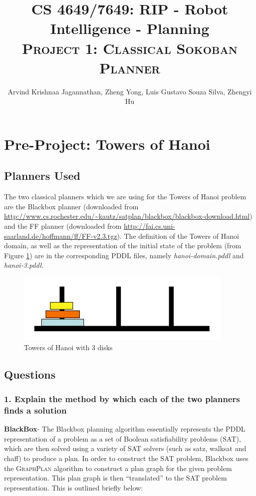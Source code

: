 \documentclass[10pt, letter]{article}
\newcommand{\doctitle}{%
CS 4649/7649: RIP - Robot Intelligence - Planning}
\begin{document}
\title{\textbf{\doctitle} \\\textsc{Project 1: Classical Sokoban Planner}}
  \author {Arvind Krishnaa Jagannathan, Zheng Yong, Luis Gustavo Souza Silva, Zhengyi Hu}%
   \date{}
\maketitle

\section{Pre-Project: Towers of Hanoi}
\subsection*{Planners Used}
The two classical planners which we are using for the Towers of Hanoi problem are the Blackbox planner \cite{kautz1998blackbox} (downloaded from \url{http://www.cs.rochester.edu/~kautz/satplan/blackbox/blackbox-download.html}) and the FF planner \cite{hoffmann2001fast} (downloaded from \url{http://fai.cs.uni-saarland.de/hoffmann/ff/FF-v2.3.tgz}). The definition of the Towers of Hanoi domain, as well as the representation of the initial state of the problem (from Figure \ref{fig1}) are in the corresponding PDDL files, namely \textit{hanoi-domain.pddl} and \textit{hanoi-3.pddl}.

\begin{figure}[h!]
  \centering
    \includegraphics[scale = 0.3]{images/hanoi1}
    \caption{Towers of Hanoi with 3 disks}
  \label{fig1}
\end{figure}

\subsection{Questions}
\subsubsection*{1. Explain the method by which each of the two planners finds a solution}
\textbf{BlackBox}- The Blackbox planning algorithm essentially represents the PDDL representation of a problem as a set of Boolean satisfiability problems (SAT), which are then solved using a variety of SAT solvers (such as satz, walksat and chaff) to produce a plan.
In order to construct the SAT problem, Blackbox uses the \textsc{GraphPlan} algorithm to construct a plan graph for the given problem representation. This plan graph is then ``translated'' to the SAT problem representation. This is outlined briefly below:
\end{document}
